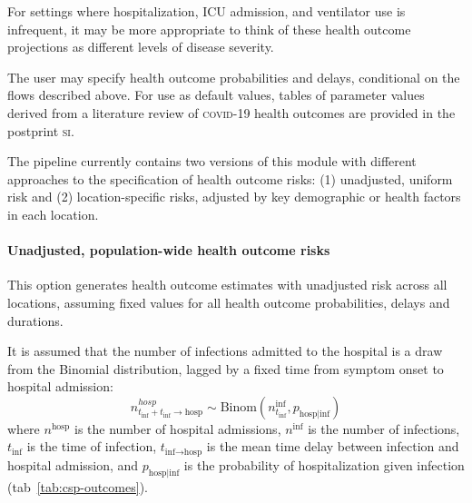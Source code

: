 {For settings where hospitalization, ICU admission, and ventilator use is infrequent, it may be more appropriate to think of these health outcome projections as different levels of disease severity.

The user may specify health outcome probabilities and delays, conditional on the flows described above. For use as default values, tables of parameter values derived from a literature review of \textsc{covid}-19 health outcomes are provided in the postprint \textsc{si}.

The pipeline currently contains two versions of this module with different approaches to the specification of health outcome risks: (1) unadjusted, uniform risk and (2) location-specific risks, adjusted by key demographic or health factors in each location.

\paragraph{Unadjusted, population-wide health outcome risks}
This option generates health outcome estimates with unadjusted risk across all locations, assuming fixed values for all health outcome probabilities, delays and durations.

It is assumed that the number of infections admitted to the hospital is a draw from the Binomial distribution, lagged by a fixed time from symptom onset to hospital admission:
\begin{equation}
n_{t_\text{inf} + t_\text{inf} \to \text{hosp}}^{hosp} \sim \text{Binom}\left(n_{t_\text{inf}}^\text{inf}, p_{\text{hosp}\mid \text{inf}} \right)
\end{equation}
where $n^\text{hosp}$ is the number of hospital admissions, $n^\text{inf}$ is the number of infections, $t_\text{inf}$ is the time of infection, $t_{\text{inf} \to \text{hosp}}$ is the mean time delay between infection and hospital admission, and $p_{\text{hosp} \mid \text{inf}}$ is the probability of hospitalization given infection (tab~\ref{tab:csp-outcomes}).

}
